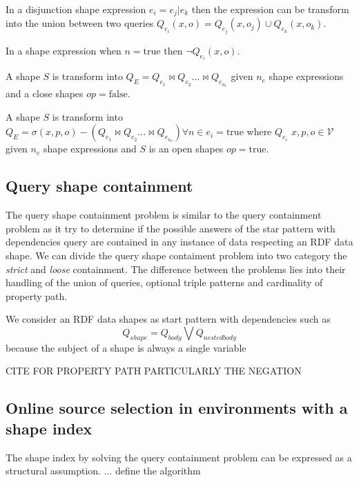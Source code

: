 \begin{prop}
   In a disjunction shape expression $e_i = e_j|e_k$ then the expression can be transform into the union between two queries
   $Q_{e_i}(x,o)= Q_{e_j}(x,o_j) \cup Q_{e_k}(x,o_k)$.
\end{prop}

\begin{prop}
   In a shape expression when $n= \mathrm{true}$ then $\neg Q_{e_i}(x,o)$.
\end{prop}

\begin{prop}
   A shape $S$ is transform into $Q_{E} = Q_{e_1} \bowtie Q_{e_2} ... \bowtie Q_{e_{n_e}}$ given $n_e$ shape expressions and a close shapes $op = \mathrm{false}$.
\end{prop}

\begin{prop}
   A shape $S$ is transform into $Q_{E} = \sigma(x, p, o) -  (Q_{e_1} \bowtie Q_{e_2} ... \bowtie Q_{e_{n_e}}) \forall n \in e_i = \mathrm{true} $ where $Q_{e_i}$ 
   $x,p, o \in \mathcal{V}$ given $n_e$ shape expressions and $S$ is an open shapes $op = \mathrm{true}$.
\end{prop}

\subsection{Query shape containment}
The query shape containment problem is similar to the query containment problem as it 
try to determine if the possible answers of the star pattern with dependencies query are contained in any instance of data respecting an RDF data shape.
We can divide the query shape contaiment problem into two category the \emph{strict} and \emph{loose} containment.
The difference between the problems lies into their handling of the union of queries, optional triple patterns and cardinality of property path.


We consider an RDF data shapes as start pattern with dependencies such as 
\begin{equation}
   Q_{shape} = Q_{body} \bigvee Q_{nested body}
\end{equation}
because the subject of a shape is always a single variable 

CITE FOR PROPERTY PATH PARTICULARLY THE NEGATION \cite{Kostylev2015}



\subsection{Online source selection in environments with a shape index}

The shape index by solving the query containment problem can be expressed as a structural assumption.
... define the algorithm